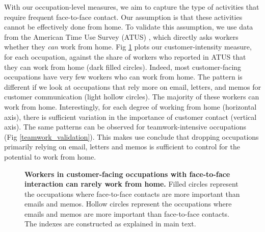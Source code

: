 With our occupation-level measures, we aim to capture the type of activities that require frequent face-to-face contact. Our assumption is that these activities cannot be effectively done from home. To validate this assumption, we use data from the American Time Use Survey (ATUS) \cite{ATUS}, which directly asks workers whether they \emph{can} work from home. Fig \ref{customer_validation} plots our customer-intensity measure, for each occupation, against the share of workers who reported in ATUS that they can work from home (dark filled circles). Indeed, most customer-facing occupations have very few workers who can work from home. The pattern is different if we look at occupations that rely more on email, letters, and memos for customer communication (light hollow circles). The majority of these workers can work from home. Interestingly, for each degree of working from home (horizontal axis), there is sufficient variation in the importance of customer contact (vertical axis). The same patterns can be observed for teamwork-intensive occupations (Fig \ref{teamwork_validation}). This makes use conclude that dropping occupations primarily relying on email, letters and memos is sufficient to control for the potential to work from home.


\begin{figure}[!h]

\caption{{\bf Workers in customer-facing occupations with face-to-face interaction can rarely work from home.}
Filled circles represent the occupations where face-to-face contacts are more important than emails and memos. Hollow circles represent the occupations where emails and memos are more important than face-to-face contacts. The indexes are constructed as explained in main text. }
\label{customer_validation}
\end{figure}

